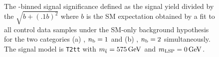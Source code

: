 \begin{figure}[t!]
  \begin{center}
     \\
    \caption{\label{fig:t2cc-sig-575} The \scalht-binned 
      signal significance defined as the signal yield 
      divided by the $\sqrt{b+(.1b)^2}$ where $b$ is the
      SM expectation obtained by a fit to all 
      control data samples under the SM-only background 
      hypothesis for the two categories (a) \njethigh, $n_{\text{b}} = 1$ and (b) 
      \njethigh, $n_{\text{b}} = 2$ simultaneously. 
      The signal model is \texttt{T2tt} with 
      $m_{\tilde{\rm t}} = 575\,\text{Ge\hspace{-.08em}V}$ and $m_{\text{LSP}} = 0\,\text{Ge\hspace{-.08em}V}$.} 
  \end{center}
\end{figure}

